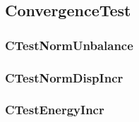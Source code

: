 \subsection{{\bf ConvergenceTest}}


\pagebreak
\subsubsection{ CTestNormUnbalance}


\pagebreak
\subsubsection{ CTestNormDispIncr}


\pagebreak
\subsubsection{ CTestEnergyIncr}
